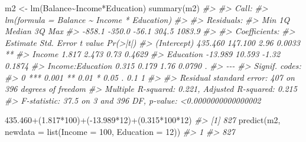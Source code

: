 \documentclass[
]{book}
\newenvironment{Shaded}{\begin{snugshade}}{\end{snugshade}}
\newcommand{\AttributeTok}[1]{\textcolor[rgb]{0.77,0.63,0.00}{#1}}
\newcommand{\CommentTok}[1]{\textcolor[rgb]{0.56,0.35,0.01}{\textit{#1}}}
\newcommand{\DecValTok}[1]{\textcolor[rgb]{0.00,0.00,0.81}{#1}}
\newcommand{\FloatTok}[1]{\textcolor[rgb]{0.00,0.00,0.81}{#1}}
\newcommand{\FunctionTok}[1]{\textcolor[rgb]{0.00,0.00,0.00}{#1}}
\newcommand{\NormalTok}[1]{#1}
\newcommand{\OtherTok}[1]{\textcolor[rgb]{0.56,0.35,0.01}{#1}}
\newcommand{\SpecialCharTok}[1]{\textcolor[rgb]{0.00,0.00,0.00}{#1}}
\begin{document}
\begin{Shaded}
\begin{Highlighting}[]
\NormalTok{m2 }\OtherTok{\textless{}{-}} \FunctionTok{lm}\NormalTok{(Balance}\SpecialCharTok{\textasciitilde{}}\NormalTok{Income}\SpecialCharTok{*}\NormalTok{Education)}
\FunctionTok{summary}\NormalTok{(m2)}
\CommentTok{\#\textgreater{} }
\CommentTok{\#\textgreater{} Call:}
\CommentTok{\#\textgreater{} lm(formula = Balance \textasciitilde{} Income * Education)}
\CommentTok{\#\textgreater{} }
\CommentTok{\#\textgreater{} Residuals:}
\CommentTok{\#\textgreater{}    Min     1Q Median     3Q    Max }
\CommentTok{\#\textgreater{} {-}858.1 {-}350.0  {-}56.1  304.5 1083.9 }
\CommentTok{\#\textgreater{} }
\CommentTok{\#\textgreater{} Coefficients:}
\CommentTok{\#\textgreater{}                  Estimate Std. Error t value Pr(\textgreater{}|t|)   }
\CommentTok{\#\textgreater{} (Intercept)       435.460    147.100    2.96   0.0033 **}
\CommentTok{\#\textgreater{} Income              1.817      2.473    0.73   0.4629   }
\CommentTok{\#\textgreater{} Education         {-}13.989     10.593   {-}1.32   0.1874   }
\CommentTok{\#\textgreater{} Income:Education    0.315      0.179    1.76   0.0790 . }
\CommentTok{\#\textgreater{} {-}{-}{-}}
\CommentTok{\#\textgreater{} Signif. codes:  }
\CommentTok{\#\textgreater{} 0 \textquotesingle{}***\textquotesingle{} 0.001 \textquotesingle{}**\textquotesingle{} 0.01 \textquotesingle{}*\textquotesingle{} 0.05 \textquotesingle{}.\textquotesingle{} 0.1 \textquotesingle{} \textquotesingle{} 1}
\CommentTok{\#\textgreater{} }
\CommentTok{\#\textgreater{} Residual standard error: 407 on 396 degrees of freedom}
\CommentTok{\#\textgreater{} Multiple R{-}squared:  0.221,  Adjusted R{-}squared:  0.215 }
\CommentTok{\#\textgreater{} F{-}statistic: 37.5 on 3 and 396 DF,  p{-}value: \textless{}0.0000000000000002}

\FloatTok{435.460}\SpecialCharTok{+}\NormalTok{(}\FloatTok{1.817}\SpecialCharTok{*}\DecValTok{100}\NormalTok{)}\SpecialCharTok{+}\NormalTok{(}\SpecialCharTok{{-}}\FloatTok{13.989}\SpecialCharTok{*}\DecValTok{12}\NormalTok{)}\SpecialCharTok{+}\NormalTok{(}\FloatTok{0.315}\SpecialCharTok{*}\DecValTok{100}\SpecialCharTok{*}\DecValTok{12}\NormalTok{)}
\CommentTok{\#\textgreater{} [1] 827}
\FunctionTok{predict}\NormalTok{(m2, }\AttributeTok{newdata =} \FunctionTok{list}\NormalTok{(}\AttributeTok{Income =} \DecValTok{100}\NormalTok{, }\AttributeTok{Education =} \DecValTok{12}\NormalTok{))}
\CommentTok{\#\textgreater{}   1 }
\CommentTok{\#\textgreater{} 827}
\end{Highlighting}
\end{Shaded}
\end{document}
